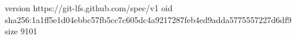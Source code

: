 version https://git-lfs.github.com/spec/v1
oid sha256:1a1ff5e1d04ebbc57fb5cc7c605dc4a9217287feb4ed9adda5775557227d6df9
size 9101
